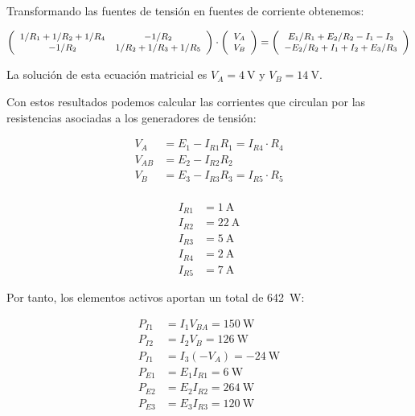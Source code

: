 \documentclass[10pt]{article}
\begin{document}
Transformando las fuentes de tensión en fuentes de corriente obtenemos:

\[
\small{
\left(\begin{array}{ccc}
    1/R_1 + 1/R_2 + 1/R_4 & -1/R_2\\
    -1/R_2 & 1/R_2 + 1/R_3 + 1/R_5
  \end{array}\right) \cdot \left(\begin{array}{c}
    V_{A}\\
    V_{B}
  \end{array}\right) = 
\left(\begin{array}{c}
        E_1/R_1 + E_2/R_2 - I_1 - I_3\\
        -E_2/R_2 + I_1 + I_2 + E_3/R_3
      \end{array}\right)
  }
\]

La solución de esta ecuación matricial es $V_A = \SI{4}{\volt}$ y $V_B = \SI{14}{\volt}$. 

Con estos resultados podemos calcular las corrientes que circulan por las resistencias asociadas a los generadores de tensión:

\begin{align*}
V_A &= E_1 - I_{R1} R_1 = I_{R4} \cdot R_4\\
V_{AB} &= E_2 - I_{R2} R_2\\
V_B &= E_3 - I_{R3} R_3 = I_{R5} \cdot R_5\\
\end{align*}

\begin{align*}
  I_{R1} &= \SI{1}{\ampere}\\
  I_{R2} &= \SI{22}{\ampere}\\
  I_{R3} &= \SI{5}{\ampere}\\
  I_{R4} &= \SI{2}{\ampere}\\
  I_{R5} &= \SI{7}{\ampere}
\end{align*}

Por tanto, los elementos activos aportan un total de \SI{642}{\watt}:

\begin{align*}
P_{I1} &= I_1 V_{BA} = \SI{150}{\watt}\\
P_{I2} &= I_2 V_{B} = \SI{126}{\watt}\\
P_{I1} &= I_3 (-V_{A}) = - \SI{24}{\watt}\\
P_{E1} &= E_1 I_{R1} = \SI{6}{\watt}\\
P_{E2} &= E_2 I_{R2} = \SI{264}{\watt}\\
P_{E3} &= E_3 I_{R3} = \SI{120}{\watt}
\end{align*}
\end{document}
